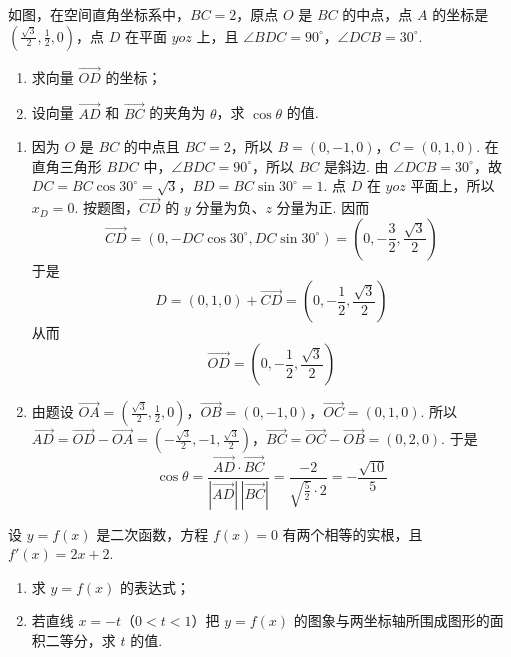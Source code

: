 \documentclass[UTF8,a4paper,oneside,11pt]{ctexbook}
\begin{document}
\setcounter{probnum}{20}
\begin{problem}[B]
如图，在空间直角坐标系中，\(BC=2\)，原点 \(O\) 是 \(BC\) 的中点，点 \(A\) 的坐标是 \(\left(\frac{\sqrt{3}}{2},\frac{1}{2},0\right)\)，点 \(D\) 在平面 \(yoz\) 上，且 \(\angle BDC=90^\circ\)，\(\angle DCB=30^\circ\).

\begin{enumerate}
\item 求向量 \(\overrightarrow{OD}\) 的坐标；
\item 设向量 \(\overrightarrow{AD}\) 和 \(\overrightarrow{BC}\) 的夹角为 \(\theta\)，求 \(\cos\theta\) 的值.
\end{enumerate}

\end{problem}

\begin{solution}
\begin{enumerate}
\item 因为 \(O\) 是 \(BC\) 的中点且 \(BC=2\)，所以
\(B=(0,-1,0)\)，\(C=(0,1,0)\).
在直角三角形 \(BDC\) 中，\(\angle BDC=90^\circ\)，所以 \(BC\) 是斜边. 由 \(\angle DCB=30^\circ\)，故
\(DC=BC\cos30^\circ=\sqrt3\)，\(BD=BC\sin30^\circ=1\).
点 \(D\) 在 \(yoz\) 平面上，所以 \(x_D=0\). 按题图，\(\overrightarrow{CD}\) 的 \(y\) 分量为负、\(z\) 分量为正. 因而
\[
\overrightarrow{CD}
=\left(0,-DC\cos30^\circ,DC\sin30^\circ\right)
=\left(0,-\frac32,\frac{\sqrt3}{2}\right)
\]
于是
\[
D=(0,1,0)+\overrightarrow{CD}
=\left(0,-\frac12,\frac{\sqrt3}{2}\right)
\]
从而
\[
\overrightarrow{OD}=\left(0,-\frac12,\frac{\sqrt3}{2}\right)
\]

\item 由题设
\(\overrightarrow{OA}=\left(\frac{\sqrt3}{2},\frac12,0\right)\)，\(\overrightarrow{OB}=(0,-1,0)\)，\(\overrightarrow{OC}=(0,1,0)\).
所以
\(\overrightarrow{AD}=\overrightarrow{OD}-\overrightarrow{OA} =\left(-\frac{\sqrt3}{2},-1,\frac{\sqrt3}{2}\right)\)，\(\overrightarrow{BC}=\overrightarrow{OC}-\overrightarrow{OB}=(0,2,0)\).
于是
\[
\cos\theta=\frac{\overrightarrow{AD}\cdot\overrightarrow{BC}}{|\overrightarrow{AD}|\,|\overrightarrow{BC}|}
=\frac{-2}{\sqrt{\frac{5}{2}}\cdot2}
=-\frac{\sqrt{10}}{5}
\]
\end{enumerate}
\end{solution}

\begin{problem}[B]
设 \(y=f(x)\) 是二次函数，方程 \(f(x)=0\) 有两个相等的实根，且 \(f'(x)=2x+2\).

\begin{enumerate}
\item 求 \(y=f(x)\) 的表达式；
\item 若直线 \(x=-t\)（\(0<t<1\)）把 \(y=f(x)\) 的图象与两坐标轴所围成图形的面积二等分，求 \(t\) 的值.
\end{enumerate}
\end{problem}
\end{document}
